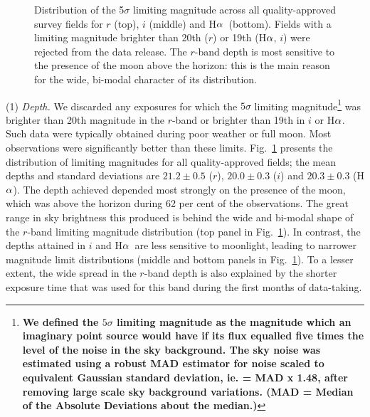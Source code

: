 \documentclass[a4paper,useAMS,usenatbib]{mn2e}
\def\ha{\mbox{H$\rm \alpha$}}
\begin{document}
\begin{figure}
\begin{minipage}[b]{\linewidth}
    \end{minipage}
    \caption{Distribution of the 5$\sigma$ limiting magnitude
             across all quality-approved survey fields
             for $r$ (top), $i$ (middle) and \ha\ (bottom).
             Fields with a limiting magnitude brighter than
             20th ($r$) or 19th (\ha, $i$) were rejected
             from the data release.
             The $r$-band depth is most sensitive 
             to the presence of the moon above the horizon: 
             this is the main reason for the wide, bi-modal character
             of its distribution.}
    \label{fig:depth}
\end{figure}

(1) \emph{Depth.} 
We discarded any exposures 
for which the $5\sigma$ limiting magnitude\footnote{\bf
We defined the $5\sigma$ limiting magnitude
as the magnitude which an imaginary point source would have
if its flux equalled five times the level of the noise in the sky background.
The sky noise was estimated using a robust MAD estimator 
for noise scaled to equivalent Gaussian standard deviation,
ie. = MAD x 1.48,
after removing large scale sky background variations.
(MAD = Median of the Absolute Deviations about the median.)}
was brighter than 20th magnitude in the $r$-band
or brighter than 19th in $i$ or \ha.
Such data were typically obtained during poor weather or full moon.
Most observations were significantly better than these limits.
Fig.~\ref{fig:depth} presents the distribution of limiting magnitudes
for all quality-approved fields;
the mean depths and standard deviations are 
$21.2\pm0.5$ ($r$), $20.0\pm0.3$ ($i$) and $20.3\pm0.3$ (\ha).
The depth achieved depended
most strongly on the presence of the moon,
which was above the horizon during 62 per cent 
of the observations.
The great range in sky brightness this
produced is behind the wide and bi-modal shape
of the $r$-band limiting magnitude distribution 
(top panel in Fig.~\ref{fig:depth}).
In contrast, the depths attained in $i$ and \ha\ 
are less sensitive to moonlight, leading to
narrower magnitude limit distributions
(middle and bottom panels in Fig.~\ref{fig:depth}).
To a lesser extent, the wide spread in the $r$-band depth
is also explained by the shorter exposure time
that was used for this band during the first months of data-taking.
\end{document}
